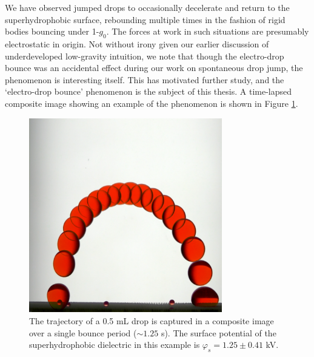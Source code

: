 \documentclass[12pt,a4paper,oneside]{book}
\begin{document}
We have observed jumped drops to occasionally decelerate and return to the superhydrophobic surface, rebounding multiple times in the fashion of rigid bodies bouncing under 1-$g_0$. The forces at work in such situations are presumably electrostatic in origin. Not without irony given our earlier discussion of underdeveloped low-gravity intuition, we note that though the electro-drop bounce was an accidental effect during our work on spontaneous drop jump, the phenomenon is interesting itself. This has motivated further study, and the `electro-drop bounce' phenomenon is the subject of this thesis. A time-lapsed composite image showing an example of the phenomenon is shown in Figure \ref{fig:bounce}.
\begin{figure}[htb]
\centering
\includegraphics[width=0.75\textwidth]{bounce}
\caption{The trajectory of a 0.5 mL drop is captured in a composite image over a single bounce period ($\sim 1.25$ s). The surface potential of the superhydrophobic dielectric in this example is $\varphi_s = 1.25 \pm 0.41$ kV. \label{fig:bounce}}
\end{figure}
\end{document}
